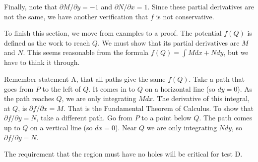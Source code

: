 {{Finally, note that $\partial M/\partial y = -1$ and $\partial N/\partial x =  1$. Since these partial derivatives are not the same, we have another verification that $f$ is not conservative.}

To finish this section, we move from examples to a proof. The potential $f(Q)$ is
defined as the work to reach $Q$. We must show that its partial derivatives are $M$ and
$N$. This seems reasonable from the formula $f (Q) = \int M dx + N dy$, but we have to
think it through.

Remember statement A, that all paths give the same $f(Q)$. Take a path that goes
from $P$ to the left of $Q$. It comes in to $Q$ on a horizontal line (so $dy = 0$). As the
path reaches $Q$, we are only integrating $M dx$. The derivative of this integral, at $Q$, is
$\partial f/\partial x = M$. That is the Fundamental Theorem of Calculus.
To show that $\partial f/\partial y= N$, take a different path. Go from $P$ to a point below $Q$. The
path comes up to $Q$ on a vertical line (so $dx = 0$). Near $Q$ we are only integrating
$N dy$, so $\partial f/\partial y= N$.

The requirement that the region must have no holes will be critical for test D.


}
